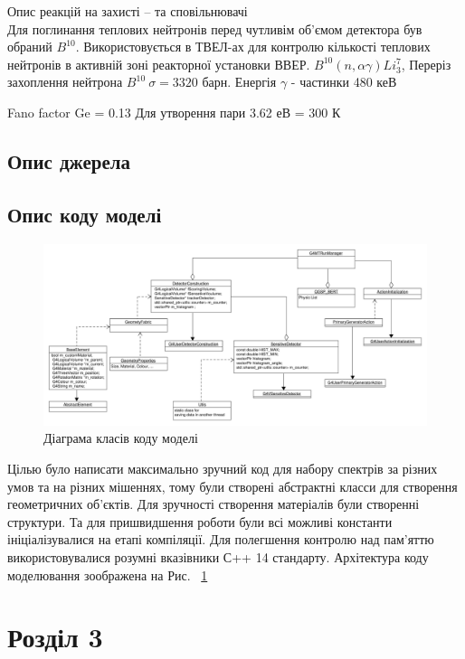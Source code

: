 \documentclass[a4paper, 14pt]{article}
\numberwithin{equation}{section}
\numberwithin{table}{section}
\begin{document}
	Опис реакцій на захисті -- та сповільнювачі \\
	Для поглинання теплових нейтронів перед чутливім об'ємом детектора був обраний $B^{10}$. Використовується в ТВЕЛ-ах для контролю кількості теплових нейтронів в активній зоні реакторної установки ВВЕР. 
	$B^{10} ( n, \alpha \gamma)Li_3^7$, Переріз захоплення нейтрона $B^{10} \ \sigma = 3320$ барн.
	Енергія $\gamma$ - частинки 480 кеВ
	
	Fano factor Ge = 0.13 
	Для утворення пари 3.62 еВ = 300 К

\subsection{Опис джерела}
	
	
\subsection{Опис коду моделі}

	\begin{figure}[hbt!]
		\centering \includegraphics[width=1\textwidth]{res/classDiagram.pdf}
		\caption{Діаграма класів коду моделі} 
		\label{ris:s_classDiagram}	
	\end{figure} 
	Цілью було написати максимально зручний код для набору спектрів за різних умов та на різних мішеннях, тому були створені абстрактні класси для створення геометричних об'єктів. Для зручності створення матеріалів були створенні структури. 
	Та для пришвидшення роботи були всі можливі константи ініціалізувалися на етапі компіляції. Для полегшення контролю над пам'яттю використовувалися розумні вказівники С++ 14 стандарту. Архітектура коду моделювання зоображена на Рис. ~\ref{ris:s_classDiagram} 
	
\newpage 
\section{Розділ 3}
\setcounter{figure}{0}
\end{document}
